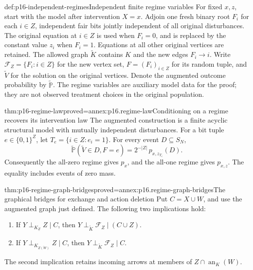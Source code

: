 \begin{hbdefinition}{def:p16-independent-regimes}{Independent finite regime variables}
For fixed \(x,z\), start with the model after intervention \(X=x\).
Adjoin one fresh binary root \(F_i\) for each \(i\in Z\),
independent fair bits jointly independent of all original disturbances.
The original equation at \(i\in Z\) is used when \(F_i=0\),
and is replaced by the constant value \(z_i\) when \(F_i=1\).
Equations at all other original vertices are retained. The allowed graph
\(\widetilde K\) contains \(K\) and the new edges \(F_i\to i\).
Write \(\mathcal F_Z=\{F_i:i\in Z\}\) for the new vertex set,
\(F=(F_i)_{i\in Z}\) for its random tuple, and \(\widetilde V\)
for the solution on the original vertices. Denote the augmented
outcome probability by \(\widetilde{\mathbb P}\).
The regime variables are auxiliary model data for the proof; they are
not observed treatment choices in the original population.
\end{hbdefinition}

\begin{hblemma}{thm:p16-regime-law}{proved=annex:p16.regime-law}{Conditioning on a regime recovers its intervention law}
The augmented construction is a finite acyclic structural model with
mutually independent disturbances. For a bit tuple \(e\in\{0,1\}^Z\),
let \(T_e=\{i\in Z:e_i=1\}\). For every event \(D\subseteq S_N\),
\[
 \widetilde{\mathbb P}(\widetilde V\in D,F=e)
 =2^{-|Z|}\,p_{x,z_{T_e}}(D).
\]
Consequently the all-zero regime gives \(p_x\), and the all-one
regime gives \(p_{x,z}\). The equality includes events of zero mass.
\end{hblemma}

\begin{hblemma}{thm:p16-regime-graph-bridges}{proved=annex:p16.regime-graph-bridges}{The graphical bridges for exchange and action deletion}
Put \(C=X\cup W\), and use the augmented graph just defined.
The following two implications hold:
\begin{enumerate}
\item If \(Y\mathrel{\perp_{K_{\underline Z}}}Z\mid C\), then
      \(Y\mathrel{\perp_{\widetilde K}}\mathcal F_Z\mid(C\cup Z)\).
\item If \(Y\mathrel{\perp_{K_{\overline{Z(W)}}}}Z\mid C\), then
      \(Y\mathrel{\perp_{\widetilde K}}\mathcal F_Z\mid C\).
\end{enumerate}
The second implication retains incoming arrows at members of
\(Z\cap\operatorname{an}_K(W)\).
\end{hblemma}

